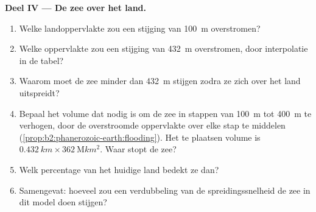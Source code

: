 \begin{problem}
\noindent\textbf{Deel IV --- De zee over het land.}
\begin{enumerate}[resume]
  \item Welke landoppervlakte zou een stijging van \qty{100}{m} overstromen?
  \item Welke oppervlakte zou een stijging van \qty{432}{m} overstromen, door interpolatie in de tabel?
  \item Waarom moet de zee minder dan \qty{432}{m} stijgen zodra ze zich over het land uitspreidt?
  \item Bepaal het volume dat nodig is om de zee in stappen van \qty{100}{m} tot \qty{400}{m} te verhogen,
        door de overstroomde oppervlakte over elke stap te middelen (\cref{prop:b2:phanerozoic-earth:flooding}).
        Het te plaatsen volume is $\qty{0.432}{km} \times \qty{362}{\mega km^2}$. Waar stopt
        de zee?
  \item Welk percentage van het huidige land bedekt ze dan?
  \item Samengevat: hoeveel zou een verdubbeling van de spreidingssnelheid de zee in dit model doen stijgen?
\end{enumerate}
\end{problem}
